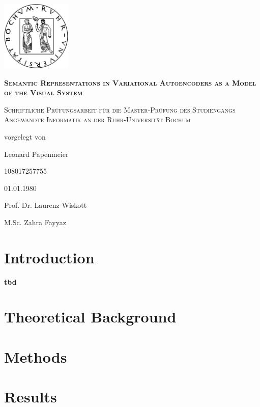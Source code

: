 \documentclass[11pt]{article}
\newcounter{savepage}
\begin{document}
\begin{titlepage}
\centering
\includegraphics[width=0.25\textwidth]{rublogo.png}\par
{\scshape\huge\bfseries Semantic Representations in Variational Autoencoders as a Model of the Visual System \par}
{\scshape\large Schriftliche Prüfungsarbeit für die Master-Prüfung des Studiengangs Angewandte Informatik an der Ruhr-Universität Bochum\par}
\vspace{1em}
vorgelegt von\par
\vspace{2em}
Leonard Papenmeier\par 108017257755\par
\vspace{2em}
01.01.1980\par

\vfill
Prof. Dr. Laurenz Wiskott\par
M.Sc. Zahra Fayyaz


\end{titlepage}
\tableofcontents
\newpage


    \section{Introduction}\label{sec:introduction}

    \textbf{tbd}


    \section{Theoretical Background}\label{sec:theoretical-background}
    


\section{Methods}\label{sec:methods}



\section{Results}\label{sec:results}

\end{document}
